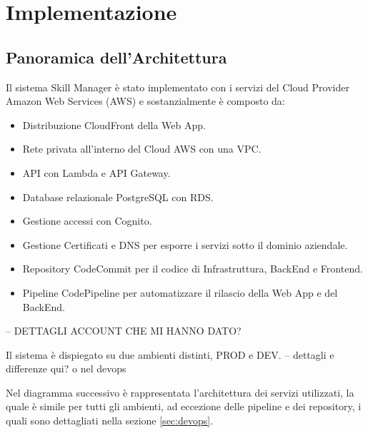\chapter{Implementazione}

\section{Panoramica dell'Architettura}

Il sistema Skill Manager è stato implementato con i servizi del Cloud Provider Amazon Web Services (AWS) e sostanzialmente è composto da:

\begin{itemize}
    \item Distribuzione CloudFront della Web App.
    \item Rete privata all’interno del Cloud AWS  con una VPC.
    \item API con Lambda e API Gateway.
    \item Database relazionale PostgreSQL con RDS.
    \item Gestione accessi con Cognito.
    \item Gestione Certificati e DNS per esporre i servizi sotto il dominio aziendale.
    \item Repository CodeCommit per il codice di Infrastruttura, BackEnd e Frontend.
    \item Pipeline CodePipeline per automatizzare il rilascio della Web App e del BackEnd.
\end{itemize}

-- DETTAGLI ACCOUNT CHE MI HANNO DATO?

Il sistema è dispiegato su due ambienti distinti, PROD e DEV. 
-- dettagli e differenze qui? o nel devops 

Nel diagramma successivo è rappresentata l'architettura dei servizi utilizzati, la quale è simile per tutti gli ambienti, ad eccezione delle pipeline e dei repository, i quali sono dettagliati nella sezione \ref{sec:devops}.

